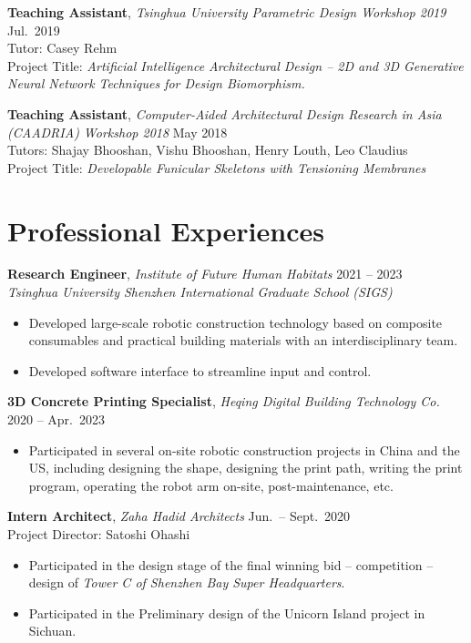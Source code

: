 \documentclass[11pt,a4paper]{article}
\newcommand{\entrytitle}[1]{\textbf{#1}}
\newcommand{\entrydetail}[1]{\textit{#1}}
\begin{document}
\entrytitle{Teaching Assistant}, \entrydetail{Tsinghua University Parametric Design Workshop 2019} \hfill Jul.\ 2019 \\
Tutor: Casey Rehm \\
Project Title: \entrydetail{Artificial Intelligence Architectural Design -- 2D and 3D Generative Neural Network Techniques for Design Biomorphism.}

\entrytitle{Teaching Assistant}, \entrydetail{Computer-Aided Architectural Design Research in Asia (CAADRIA) Workshop 2018} \hfill May 2018 \\
Tutors: Shajay Bhooshan, Vishu Bhooshan, Henry Louth, Leo Claudius \\
Project Title: \entrydetail{Developable Funicular Skeletons with Tensioning Membranes}

\section{Professional Experiences}

\entrytitle{Research Engineer}, \entrydetail{Institute of Future Human Habitats} \hfill 2021 -- 2023 \\
\entrydetail{Tsinghua University Shenzhen International Graduate School (SIGS)}
\begin{itemize}[nosep, leftmargin=1.5em]
    \item Developed large-scale robotic construction technology based on composite consumables and practical building materials with an interdisciplinary team.
    \item Developed software interface to streamline input and control.
\end{itemize}

\entrytitle{3D Concrete Printing Specialist}, \entrydetail{Heqing Digital Building Technology Co.} \hfill 2020 -- Apr.\ 2023
\begin{itemize}[nosep, leftmargin=1.5em]
    \item Participated in several on-site robotic construction projects in China and the US, including designing the shape, designing the print path, writing the print program, operating the robot arm on-site, post-maintenance, etc.
\end{itemize}

\entrytitle{Intern Architect}, \entrydetail{Zaha Hadid Architects} \hfill Jun.\ -- Sept.\ 2020 \\
Project Director: Satoshi Ohashi
\begin{itemize}[nosep, leftmargin=1.5em]
    \item Participated in the design stage of the final winning bid -- competition -- design of \textit{Tower C of Shenzhen Bay Super Headquarters}.
    \item Participated in the Preliminary design of the Unicorn Island project in Sichuan.
\end{itemize}
\end{document}
